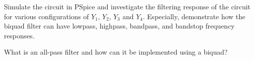 \documentclass[11pt]{article}
\begin{document}
\begin{question}
    \begin{subquestion}{Simulate the circuit in PSpice and investigate the filtering response of the circuit for various configurations of $Y_1$, $Y_2$, $Y_3$ and $Y_4$. Especially, demonstrate how the biquad filter can have lowpass, highpass, bandpass, and bandstop frequency responses.}
        \answer{}
    \end{subquestion}
    \begin{subquestion}{What is an all-pass filter and how can it be implemented using a biquad?}
        \answer{}
    \end{subquestion}

\end{question}



\begin{question}


\end{question}

\end{document}
